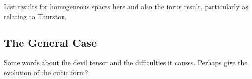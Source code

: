 \documentclass[a4paper, 12pt]{amsart}
\begin{document}
{\color{red} List results for homogeneous spaces here and also the torus result, particularly as relating to Thurston.}

\subsection{The General Case}
\label{subsec:xcf_general}

{\color{red} Some words about the devil tensor and the difficulties it causes. Perhaps give the evolution of the cubic form?}

\section*{}

\printbibliography
\end{document}
